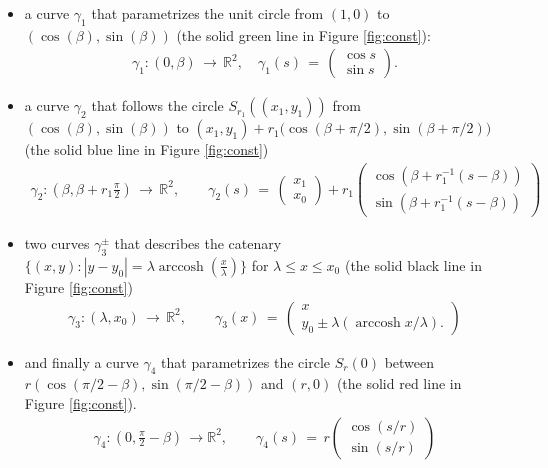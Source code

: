 \documentclass[reqno,makeidx,12pt]{amsart}
\theoremstyle{note}
\theoremstyle{definition}
\begin{document}
\begin{itemize}
\item
a curve $\gamma_1$ that parametrizes the unit circle from $(1,0)$ to
$(\cos(\beta),\sin(\beta))$  (the solid green line in Figure
\ref{fig:const}):
\begin{gather*}
  \gamma_1: (0,\beta)\,\to\, {\mathbb R}^2,\quad \gamma_1(s)\,=\,
  \begin{pmatrix}\cos s\\ \sin s\end{pmatrix}.
\end{gather*}
\item
a curve $\gamma_2$ that follows the circle $S_{r_1}((x_1,y_1))$ from
$(\cos(\beta),\sin(\beta))$ to
$(x_1,y_1)+r_1\big(\cos(\beta+\pi/2),\sin(\beta+\pi/2)\big)$ (the solid
blue line in Figure \ref{fig:const})  
\begin{gather}
  \gamma_2: (\beta,\beta+r_1\frac{\pi}{2})\,\to\, {\mathbb R}^2, \qquad
  \gamma_2(s)\,=\, \begin{pmatrix}x_1\\x_0\end{pmatrix} +
  r_1\begin{pmatrix}\cos (\beta +r_1^{-1}(s-\beta))\\
    \sin (\beta  +r_1^{-1}(s-\beta)) \end{pmatrix}
\end{gather}
\item
two curves $\gamma_3^\pm$ that describes the catenary $\{(x,y): |y - y_0| = \lambda
\operatorname{arccosh}(\frac{x}{\lambda})\}$ for $\lambda\leq x\leq x_0$ (the solid
black line in Figure \ref{fig:const})
\begin{gather*}
  \gamma_3: (\lambda,x_0)\,\to\, {\mathbb R}^2, \qquad \gamma_3(x)\,=\, 
  \begin{pmatrix} x\\ y_0 \pm  \lambda (\operatorname{arccosh} x/\lambda). 
  \end{pmatrix}
\end{gather*}
\item
and finally a curve $\gamma_4$ that parametrizes the circle $S_{r}(0)$ between
$r(\cos(\pi/2-\beta),\sin(\pi/2-\beta))$ and $(r,0)$ (the solid red line in Figure
\ref{fig:const}).
\begin{gather*}
  \gamma_4: (0,\frac{\pi}{2}-\beta)\,\to{\mathbb R}^2,\qquad \gamma_4(s)\,=\,
  r\begin{pmatrix} \cos (s/r)\\\sin (s/r)\end{pmatrix}
\end{gather*}
\end{itemize}
\end{document}
